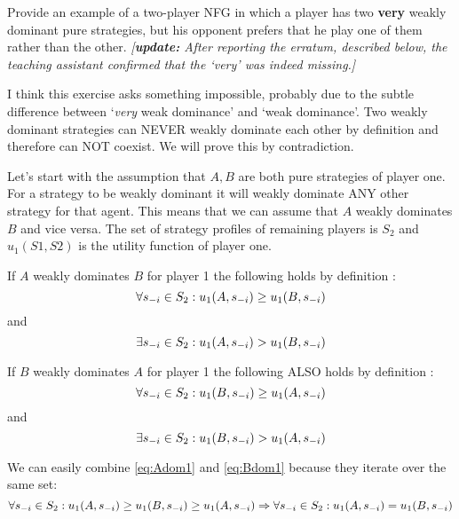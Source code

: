 \documentclass[../main.tex]{subfiles}
\begin{document}
\begin{question}
Provide an example of a two-player NFG in which a player has two \textbf{very} weakly dominant pure strategies, but his opponent prefers that he play one of them rather than the other.
	\textit{[\textbf{update:} After reporting the erratum, described below, the teaching assistant confirmed that the `very' was indeed missing.]}
\end{question}

\begin{solution}
	\label{twoweak}
	I think this exercise asks something impossible, probably due to the subtle difference between `\emph{very} weak dominance' and `weak dominance'.
	Two weakly dominant strategies can NEVER weakly dominate each other by definition and therefore can NOT coexist.
	We will prove this by contradiction.

	Let's start with the assumption that $A,B$ are both pure strategies of player one.
	For a strategy to be weakly dominant it will weakly dominate ANY other strategy for that agent.
	This means that we can assume that $A$ weakly dominates $B$ and vice versa.
	The set of strategy profiles of remaining players is $S_2$ and $u_1(S1,S2)$ is the utility function of player one.

	If $A$ weakly dominates $B$ for player 1 the following holds by definition :
	\begin{equation}
		\label{eq:Adom1}
		\forall s_{\--i} \in S_2 : u_1(A,s_{\--i}) \geq u_1(B,s_{\--i})
	\end{equation}
	and
	\begin{equation}
		\label{eq:Adom2}
		\exists s_{\--i} \in S_2 : u_1(A,s_{\--i}) > u_1(B,s_{\--i})
	\end{equation}

	If $B$ weakly dominates $A$ for player 1 the following ALSO holds by definition :
	\begin{equation}
		\label{eq:Bdom1}
		\forall s_{\--i} \in S_2 : u_1(B,s_{\--i}) \geq u_1(A,s_{\--i})
	\end{equation}
	and
	\begin{equation}
		\label{eq:Bdom2}
		\exists s_{\--i} \in S_2 : u_1(B,s_{\--i}) > u_1(A,s_{\--i})
	\end{equation}

	We can easily combine \autoref{eq:Adom1} and \autoref{eq:Bdom1} because they iterate over the same set:
	\begin{equation}
		\label{eq:equal}
		\forall s_{\--i} \in S_2 : u_1(A,s_{\--i}) \geq u_1(B,s_{\--i}) \geq u_1(A,s_{\--i}) \\ \Rightarrow \forall s_{\--i} \in S_2 :  u_1(A,s_{\--i}) = u_1(B,s_{\--i})
	\end{equation}


\end{solution}
\end{document}
